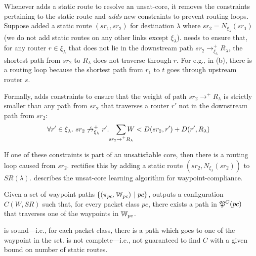 Whenever \name adds a static route to resolve an unsat-core,
it removes the constraints pertaining to 
the static route and \emph{adds} new constraints to prevent
routing loops. 
Suppose \name added a static route $(sr_1, sr_2)$ for destination
$\lambda$ where $sr_2 = N_{\xi_\lambda}(sr_1)$ (we do not add
static routes on any other links except $\xi_\lambda$). \name needs to
ensure that, for any router $r\in\xi_\lambda$ that does not 
lie in the downstream path $sr_2 \rightarrow^+_{\xi_\lambda} R_\lambda$, 
the shortest path from $sr_2$ to $R_\lambda$ does not traverse through 
$r$. For e.g., 
in (b), there is a routing loop because
 the shortest path from $r_1$ to $t$ 
 goes through upstream router $s$.

Formally, \name adds constraints to 
ensure that the weight
of path $sr_2 \rightarrow^+ R_\lambda$ is 
strictly smaller than any path from $sr_2$ that traverses a
router $r'$ not in the downstream path from $sr_2$: 
\begin{equation} \label{eq:rla}
\forall r' \in \xi_\lambda. ~sr_2 \not\rightarrow_{\xi_\lambda}^+ r'. 
\hspace{0.3cm}\sum_{\mathclap{\substack{sr_2 \rightarrow^+ R_\lambda}}} 
W < D(sr_2, r') + D(r', R_\lambda) 
\end{equation}

If one of these constraints is part of an unsatisfiable
core, then there is a routing 
loop caused from $sr_2$. 
\name rectifies this 
by adding a static route 
$(sr_2, N_{\xi_\lambda}(sr_2))$ to $SR(\lambda)$. 
 describes the unsat-core learning algorithm
for waypoint-compliance.

\iffull
\begin{theorem} \label{thm:wayptsr}
	Given a set of waypoint paths \linebreak
	$\{(\pi_{pc}, \mathbb{W}_{pc}) ~|~ pc\}$,
	 outputs a configuration $C(W,SR)$ 
	such that, for every packet class $pc$, 
	there exists a path in $\mathfrak{P}^C(pc)$ that
	traverses one of the waypoints in $\mathbb{W}_{pc}$.
\end{theorem}

\fi

 is sound---i.e., for each packet class, there is a 
path which goes to one of the waypoint in the set. 
 is not complete---i.e., not  
guaranteed to find $C$ with a given bound on number of static routes. 

